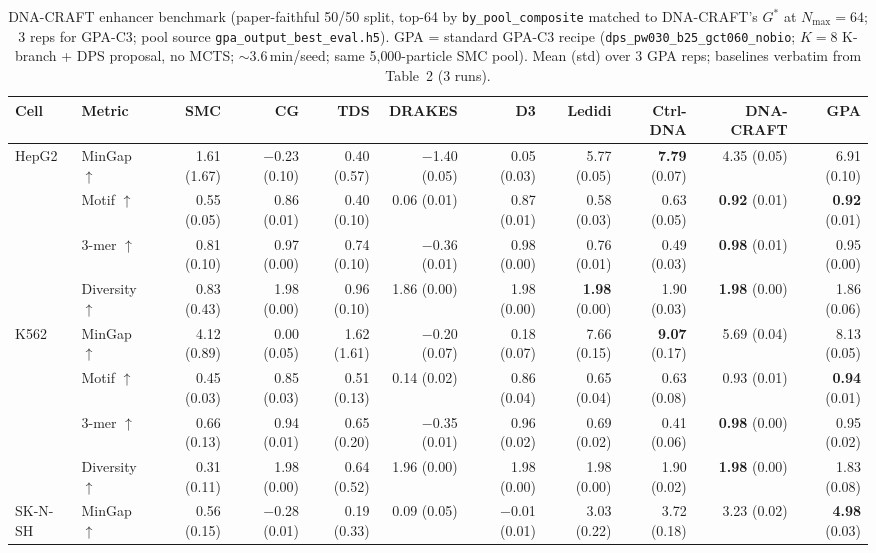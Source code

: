 \documentclass{article}
\theoremstyle{definition}
\theoremstyle{remark}
\newcommand{\gpa}{\textsc{GPA}\xspace}
\newcommand{\dnacraft}{\textsc{DNA-CRAFT}\xspace}
\begin{document}
\begin{table}[t]
\caption{\dnacraft{} enhancer benchmark (paper-faithful 50/50 split, top-64 by \texttt{by\_pool\_composite} matched to \dnacraft{}'s $G^\ast$ at $N_{\max}\!=\!64$; 3 reps for \gpa{}-C3; pool source \texttt{gpa\_output\_best\_eval.h5}). \gpa{} = standard \gpa{}-C3 recipe (\texttt{dps\_pw030\_b25\_gct060\_nobio}; $K\!=\!8$ K-branch + DPS proposal, no MCTS; $\sim$3.6\,min/seed; same 5{,}000-particle SMC pool). Mean (std) over 3 \gpa{} reps; baselines verbatim from \citet{dnacraft2026} Table~2 (3 runs).}
\label{tab:dnacraft}
\centering
\scriptsize
\setlength{\tabcolsep}{3pt}
\begin{tabular}{llrrrrrrrrr}
\toprule
Cell & Metric & SMC & CG & TDS & DRAKES & D3 & Ledidi & Ctrl-DNA & DNA-CRAFT & \textbf{\gpa{}} \\
\midrule
\multirow{4}{*}{HepG2}
 & MinGap $\uparrow$    & 1.61 (1.67) & $-$0.23 (0.10) & 0.40 (0.57) & $-$1.40 (0.05) & 0.05 (0.03) & 5.77 (0.05) & \textbf{7.79} (0.07) & 4.35 (0.05) & 6.91 (0.10) \\
 & Motif $\uparrow$     & 0.55 (0.05) & 0.86 (0.01) & 0.40 (0.10) & 0.06 (0.01) & 0.87 (0.01) & 0.58 (0.03) & 0.63 (0.05) & \textbf{0.92} (0.01) & \textbf{0.92} (0.01) \\
 & 3-mer $\uparrow$     & 0.81 (0.10) & 0.97 (0.00) & 0.74 (0.10) & $-$0.36 (0.01) & 0.98 (0.00) & 0.76 (0.01) & 0.49 (0.03) & \textbf{0.98} (0.01) & 0.95 (0.00) \\
 & Diversity $\uparrow$ & 0.83 (0.43) & 1.98 (0.00) & 0.96 (0.10) & 1.86 (0.00) & 1.98 (0.00) & \textbf{1.98} (0.00) & 1.90 (0.03) & \textbf{1.98} (0.00) & 1.86 (0.06) \\
\midrule
\multirow{4}{*}{K562}
 & MinGap $\uparrow$    & 4.12 (0.89) & 0.00 (0.05) & 1.62 (1.61) & $-$0.20 (0.07) & 0.18 (0.07) & 7.66 (0.15) & \textbf{9.07} (0.17) & 5.69 (0.04) & 8.13 (0.05) \\
 & Motif $\uparrow$     & 0.45 (0.03) & 0.85 (0.03) & 0.51 (0.13) & 0.14 (0.02) & 0.86 (0.04) & 0.65 (0.04) & 0.63 (0.08) & 0.93 (0.01) & \textbf{0.94} (0.01) \\
 & 3-mer $\uparrow$     & 0.66 (0.13) & 0.94 (0.01) & 0.65 (0.20) & $-$0.35 (0.01) & 0.96 (0.02) & 0.69 (0.02) & 0.41 (0.06) & \textbf{0.98} (0.00) & 0.95 (0.02) \\
 & Diversity $\uparrow$ & 0.31 (0.11) & 1.98 (0.00) & 0.64 (0.52) & 1.96 (0.00) & 1.98 (0.00) & 1.98 (0.00) & 1.90 (0.02) & \textbf{1.98} (0.00) & 1.83 (0.08) \\
\midrule
\multirow{4}{*}{SK-N-SH}
 & MinGap $\uparrow$    & 0.56 (0.15) & $-$0.28 (0.01) & 0.19 (0.33) & 0.09 (0.05) & $-$0.01 (0.01) & 3.03 (0.22) & 3.72 (0.18) & 3.23 (0.02) & \textbf{4.98} (0.03) \\

\end{tabular}
\end{table}
\end{document}
